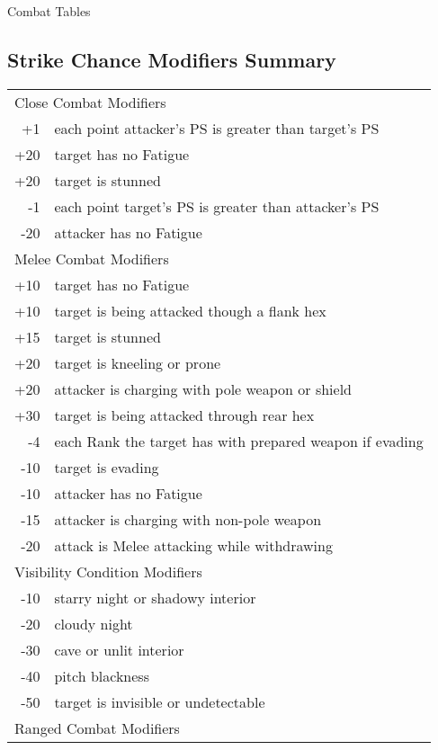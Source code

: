 \begin{Tables}{Combat Tables}

\begin{multicols}{3}

\raggedcolumns
  
\section{Strike Chance Modifiers Summary}

\begin{tabularx}{\columnwidth}{rX}
\multicolumn{2}{l}{Close Combat Modifiers} \\
+1 	& each point attacker’s PS is greater than target’s PS \\
+20	& target has no Fatigue \\
+20	& target is stunned \\
-1	& each point target’s PS is greater than attacker’s PS \\
-20	& attacker has no Fatigue \\
\multicolumn{2}{l}{Melee Combat Modifiers} \\
+10	& target has no Fatigue \\
+10	& target is being attacked though a flank hex \\
+15	& target is stunned \\
+20	& target is kneeling or prone \\
+20	& attacker is charging with pole weapon or shield \\
+30	& target is being attacked through rear hex \\
-4	& each Rank the target has with prepared weapon if evading \\
-10	& target is evading \\
-10	& attacker has no Fatigue \\
-15	& attacker is charging with non-pole weapon \\
-20	& attack is Melee attacking while withdrawing \\
\multicolumn{2}{l}{Visibility Condition Modifiers} \\
-10	& starry night or shadowy interior \\
-20	& cloudy night \\
-30	& cave or unlit interior \\
-40	& pitch blackness \\
-50	& target is invisible or undetectable \\
\multicolumn{2}{l}{Ranged Combat Modifiers} \\

\end{tabularx}
\end{multicols}
\end{Tables}
